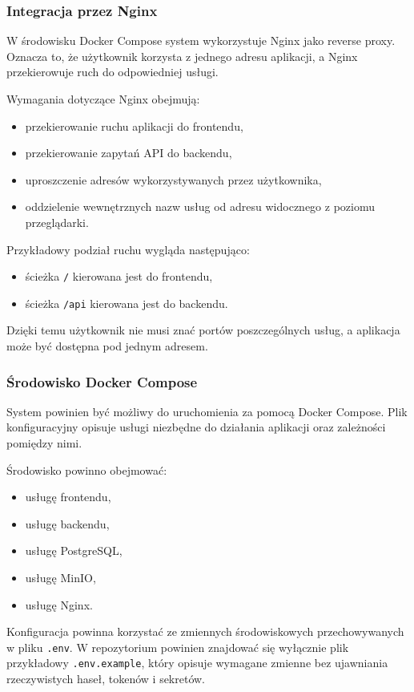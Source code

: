 \subsubsection{Integracja przez Nginx}

W środowisku Docker Compose system wykorzystuje Nginx jako reverse proxy. Oznacza to, że użytkownik korzysta z jednego adresu aplikacji, a Nginx przekierowuje ruch do odpowiedniej usługi.

Wymagania dotyczące Nginx obejmują:
\begin{itemize}
    \item przekierowanie ruchu aplikacji do frontendu,
    \item przekierowanie zapytań API do backendu,
    \item uproszczenie adresów wykorzystywanych przez użytkownika,
    \item oddzielenie wewnętrznych nazw usług od adresu widocznego z poziomu przeglądarki.
\end{itemize}

Przykładowy podział ruchu wygląda następująco:
\begin{itemize}
    \item ścieżka \texttt{/} kierowana jest do frontendu,
    \item ścieżka \texttt{/api} kierowana jest do backendu.
\end{itemize}

Dzięki temu użytkownik nie musi znać portów poszczególnych usług, a aplikacja może być dostępna pod jednym adresem.

\subsubsection{Środowisko Docker Compose}

System powinien być możliwy do uruchomienia za pomocą Docker Compose. Plik konfiguracyjny opisuje usługi niezbędne do działania aplikacji oraz zależności pomiędzy nimi.

Środowisko powinno obejmować:
\begin{itemize}
    \item usługę frontendu,
    \item usługę backendu,
    \item usługę PostgreSQL,
    \item usługę MinIO,
    \item usługę Nginx.
\end{itemize}

Konfiguracja powinna korzystać ze zmiennych środowiskowych przechowywanych w pliku \texttt{.env}. W repozytorium powinien znajdować się wyłącznie plik przykładowy \texttt{.env.example}, który opisuje wymagane zmienne bez ujawniania rzeczywistych haseł, tokenów i sekretów.

